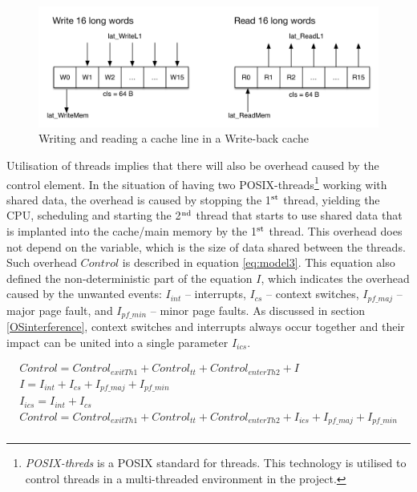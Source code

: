 \begin{figure}[ht!]
\centering
\includegraphics[width=145mm]{3/cacheline.png}
\caption{Writing and reading a cache line in a Write-back cache}
\label{cacheline}
\end{figure}

Utilisation of threads implies that there will also be overhead caused by the control element. In the situation of having two POSIX-threads\footnote{\textit{POSIX-threds} is a POSIX standard for threads. This technology is utilised to control threads in a multi-threaded environment in the project.} working with shared data, the overhead is caused by stopping the 1$^{\textnormal{st}}$ thread, yielding the CPU, scheduling and starting the 2$^{\textnormal{nd}}$ thread that starts to use shared data that is implanted into the cache/main memory by the 1$^{\textnormal{st}}$ thread. This overhead does not depend on the variable, which is the size of data shared between the threads. Such overhead $Control$ is described in equation \eqref{eq:model3}. This equation also defined the non-deterministic part of the equation $I$, which indicates the overhead caused by the unwanted events: $I_{int}$ -- interrupts, $I_{cs}$ -- context switches, $I_{pf\_maj}$ -- major page fault, and $I_{pf\_min}$ -- minor page faults. As discussed in section \ref{OSinterference}, context switches and interrupts always occur together and their impact can be united into a single parameter $I_{ics}$.

\begin{equation}\label{eq:model3}
\begin{split}
Control = Control_{exitTh1} + Control_{tt} + Control_{enterTh2} + I \\
I = I_{int} + I_{cs} + I_{pf\_maj} + I_{pf\_min} \\
I_{ics} = I_{int} + I_{cs} \\
Control = Control_{exitTh1} + Control_{tt} + Control_{enterTh2} + I_{ics} + I_{pf\_maj} + I_{pf\_min} \\
\end{split}
\end{equation}

